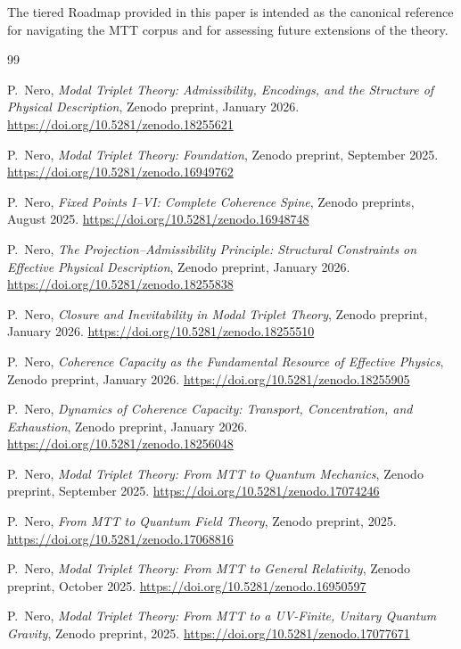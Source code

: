\documentclass[11pt]{article}
\begin{document}
The tiered Roadmap provided in this paper is intended as the canonical
reference for navigating the MTT corpus and for assessing future
extensions of the theory.
\begin{thebibliography}{99}

P.~Nero,
\emph{Modal Triplet Theory: Admissibility, Encodings, and the Structure of Physical Description},
Zenodo preprint, January 2026.
\url{https://doi.org/10.5281/zenodo.18255621}

P.~Nero,
\emph{Modal Triplet Theory: Foundation},
Zenodo preprint, September 2025.
\url{https://doi.org/10.5281/zenodo.16949762}

P.~Nero,
\emph{Fixed Points I--VI: Complete Coherence Spine},
Zenodo preprints, August 2025.
\url{https://doi.org/10.5281/zenodo.16948748}

P.~Nero,
\emph{The Projection--Admissibility Principle: Structural Constraints on Effective Physical Description},
Zenodo preprint, January 2026.
\url{https://doi.org/10.5281/zenodo.18255838}

P.~Nero,
\emph{Closure and Inevitability in Modal Triplet Theory},
Zenodo preprint, January 2026.
\url{https://doi.org/10.5281/zenodo.18255510}

P.~Nero,
\emph{Coherence Capacity as the Fundamental Resource of Effective Physics},
Zenodo preprint, January 2026.
\url{https://doi.org/10.5281/zenodo.18255905}

P.~Nero,
\emph{Dynamics of Coherence Capacity: Transport, Concentration, and Exhaustion},
Zenodo preprint, January 2026.
\url{https://doi.org/10.5281/zenodo.18256048}

P.~Nero,
\emph{Modal Triplet Theory: From MTT to Quantum Mechanics},
Zenodo preprint, September 2025.
\url{https://doi.org/10.5281/zenodo.17074246}

P.~Nero,
\emph{From MTT to Quantum Field Theory},
Zenodo preprint, 2025.
\url{https://doi.org/10.5281/zenodo.17068816}

P.~Nero,
\emph{Modal Triplet Theory: From MTT to General Relativity},
Zenodo preprint, October 2025.
\url{https://doi.org/10.5281/zenodo.16950597}

P.~Nero,
\emph{Modal Triplet Theory: From MTT to a UV-Finite, Unitary Quantum Gravity},
Zenodo preprint, 2025.
\url{https://doi.org/10.5281/zenodo.17077671}


\end{thebibliography}
\end{document}
